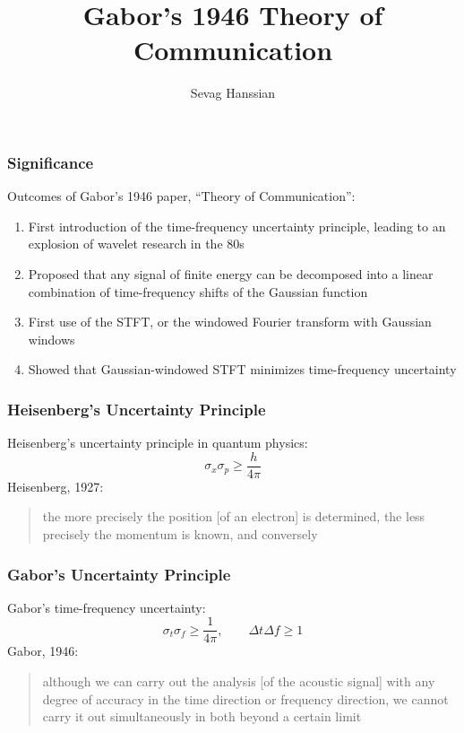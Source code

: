 \documentclass{beamer}
\title{Gabor's 1946 Theory of Communication}
\author{Sevag Hanssian}
\institute{MUMT 622, Winter 2021}
\begin{document}
\begin{frame}
\maketitle
\end{frame}

\begin{frame}
	\frametitle{Significance}
	Outcomes of Gabor's 1946 paper, ``Theory of Communication'':
	\vspace{0.5em}
	\begin{enumerate}
		\item
			First introduction of the time-frequency uncertainty principle, leading to an explosion of wavelet research in the 80s
		\item
			Proposed that any signal of finite energy can be decomposed into a linear combination of time-frequency shifts of the Gaussian function
		\item
			First use of the STFT, or the windowed Fourier transform with Gaussian windows
		\item
			Showed that Gaussian-windowed STFT minimizes time-frequency uncertainty
	\end{enumerate}
\end{frame}

\begin{frame}
	\frametitle{Heisenberg's Uncertainty Principle}
	Heisenberg's uncertainty principle in quantum physics:
	    \[ \sigma_{x}\sigma_{p} \ge \frac{h}{4\pi} \]
	    Heisenberg, 1927:
	    \begin{quote}
		    the more precisely the position [of an electron] is determined, the less precisely the momentum is known, and conversely
	    \end{quote}
\end{frame}


\begin{frame}
	\frametitle{Gabor's Uncertainty Principle}
	Gabor's time-frequency uncertainty:
	    \[ \sigma_{t}\sigma_{f} \ge \frac{1}{4\pi},\qquad\Delta t\Delta f \ge 1 \]
	    Gabor, 1946:
	    \begin{quote}
		    although we can carry out the analysis [of the acoustic signal] with any degree of accuracy in the time direction or frequency direction, we cannot carry it out simultaneously in both beyond a certain limit
	    \end{quote}
\end{frame}
\end{document}
